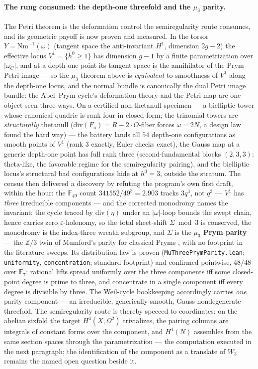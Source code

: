 \documentclass[11pt]{article}
\theoremstyle{definition}
\theoremstyle{remark}
\begin{document}
\paragraph{The rung consumed: the depth-one threefold and the $\mu_3$
parity.} The Petri theorem is the deformation control the semiregularity
route consumes, and its geometric payoff is now proven and measured. In
the torsor $Y=\mathrm{Nm}^{-1}(\omega)$ (tangent space the anti-invariant
$H^1$, dimension $2g-2$) the effective locus $V^1=\{h^0\ge1\}$ has
dimension $g-1$ by a finite parametrization over $|\omega_C|$, and at a
depth-one point its tangent space is the annihilator of the Prym--Petri
image --- so the $\mu_3$ theorem above is \emph{equivalent} to smoothness
of $V^1$ along the depth-one locus, and the normal bundle is canonically
the dual Petri image bundle: the Abel--Prym cycle's deformation theory and
the Petri map are one object seen three ways. On a certified non-thetanull
specimen --- a bielliptic tower whose canonical quadric is rank four in
closed form; the trinomial towers are \emph{structurally} thetanull
($\mathrm{div}(F_u)=R-2\cdot O$-fiber forces $\omega=2N$, a design law
found the hard way) --- the battery lands all $54$ depth-one
configurations as smooth points of $V^1$ (rank $3$ exactly, Euler checks
exact), the Gauss map at a generic depth-one point has full rank three
(second-fundamental blocks $(2,3,3)$: theta-like, the favorable regime
for the semiregularity pairing), and the bielliptic locus's structural bad
configurations hide at $h^0=3$, outside the stratum. The census then
delivered a discovery by refuting the program's own first draft, within
the hour: the $\mathbb F_{49}$ count $341552/49^3=2.903$ tracks $3q^3$,
not $q^3$ --- $V^1$ has \emph{three} irreducible components --- and the
corrected monodromy names the invariant: the cycle traced by
$\mathrm{div}(\eta)$ under an $|\omega|$-loop bounds the swept chain,
hence carries zero $\varepsilon$-holonomy, so the total sheet-shift
$\Sigma\bmod3$ is conserved, the monodromy is the index-three wreath
subgroup, and $\Sigma$ is the \textbf{$\mu_3$ Prym parity} --- the
$\mathbb Z/3$ twin of Mumford's parity for classical Pryms
\cite{MumfordPrym}, with no footprint in the literature sweeps. Its
distribution law is proven (\texttt{MuThreePrymParity.lean}:
\texttt{uniformity}, \texttt{concentration}; standard footprint) and
confirmed pointwise, $48/48$ over $\mathbb F_7$: rational lifts spread
uniformly over the three components iff some closed-point degree is prime
to three, and concentrate in a single component iff every degree is
divisible by three. The Weil-cycle bookkeeping accordingly carries
\emph{one} parity component --- an irreducible, generically smooth,
Gauss-nondegenerate threefold. The semiregularity route is thereby specced
to coordinates: on the abelian sixfold the target $H^4(X,\Omega^2)$
trivializes, the pairing columns are integrals of constant forms over the
component, and $H^1(N)$ assembles from the same section spaces through the
parametrization --- the computation executed in the next paragraph; the
identification of the component as a translate of $W_3$ remains the named
open question beside it.
\end{document}
